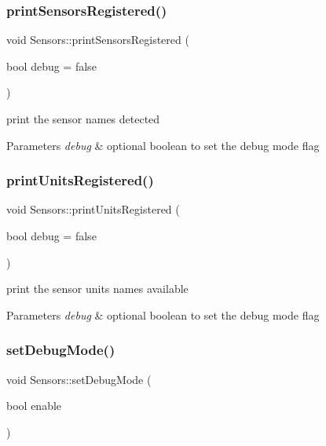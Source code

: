 \subsubsection{\texorpdfstring{print\+Sensors\+Registered()}{printSensorsRegistered()}}
{\footnotesize\ttfamily void Sensors\+::print\+Sensors\+Registered (\begin{DoxyParamCaption}\item[{bool}]{debug = {\ttfamily false} }\end{DoxyParamCaption})}



print the sensor names detected 


\begin{DoxyParams}{Parameters}
{\em debug} & optional boolean to set the debug mode flag \\
\hline
\end{DoxyParams}
\mbox{\label{classSensors_a0e9516d728256efd1eba97ef834cd385}} 
\subsubsection{\texorpdfstring{print\+Units\+Registered()}{printUnitsRegistered()}}
{\footnotesize\ttfamily void Sensors\+::print\+Units\+Registered (\begin{DoxyParamCaption}\item[{bool}]{debug = {\ttfamily false} }\end{DoxyParamCaption})}



print the sensor units names available 


\begin{DoxyParams}{Parameters}
{\em debug} & optional boolean to set the debug mode flag \\
\hline
\end{DoxyParams}
\mbox{\label{classSensors_ac749e2c2618a177afa7d72ce68573fa5}} 
\subsubsection{\texorpdfstring{set\+Debug\+Mode()}{setDebugMode()}}
{\footnotesize\ttfamily void Sensors\+::set\+Debug\+Mode (\begin{DoxyParamCaption}\item[{bool}]{enable }\end{DoxyParamCaption})}



